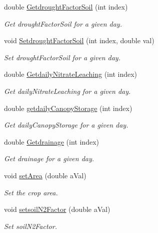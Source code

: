 \begin{DoxyCompactItemize}
double \mbox{\hyperlink{class_crop_class_a29f806e9033e77e5e9b640bc5313278e}{Getdrought\+Factor\+Soil}} (int index)
\begin{DoxyCompactList}\small\item\em Get drought\+Factor\+Soil for a given day. \end{DoxyCompactList}\item 
void \mbox{\hyperlink{class_crop_class_a2bcefb01fa7786fa0748309762c836e6}{Setdrought\+Factor\+Soil}} (int index, double val)
\begin{DoxyCompactList}\small\item\em Set drought\+Factor\+Soil for a given day. \end{DoxyCompactList}\item 
double \mbox{\hyperlink{class_crop_class_a9bb49dbad723be1d656cb77e9b1b6e6b}{Getdaily\+Nitrate\+Leaching}} (int index)
\begin{DoxyCompactList}\small\item\em Get daily\+Nitrate\+Leaching for a given day. \end{DoxyCompactList}\item 
double \mbox{\hyperlink{class_crop_class_a58ec73100806c46a3249f75387959022}{getdaily\+Canopy\+Storage}} (int index)
\begin{DoxyCompactList}\small\item\em Get daily\+Canopy\+Storage for a given day. \end{DoxyCompactList}\item 
double \mbox{\hyperlink{class_crop_class_a98a0ffbeac8642db5748781f681653ce}{Getdrainage}} (int index)
\begin{DoxyCompactList}\small\item\em Get drainage for a given day. \end{DoxyCompactList}\item 
void \mbox{\hyperlink{class_crop_class_a4e56ddc1b7f6cc37bc9e540706c1fac4}{set\+Area}} (double a\+Val)
\begin{DoxyCompactList}\small\item\em Set the crop area. \end{DoxyCompactList}\item 
void \mbox{\hyperlink{class_crop_class_aaea27372e056e9595593e0757fda4ecb}{setsoil\+N2\+Factor}} (double a\+Val)
\begin{DoxyCompactList}\small\item\em Set soil\+N2\+Factor. \end{DoxyCompactList}\item 

\end{DoxyCompactItemize}
